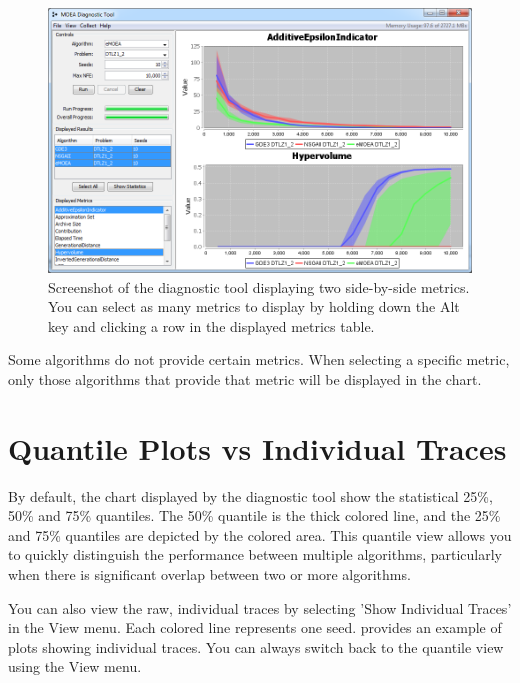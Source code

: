 \begin{figure}
  \includegraphics[width=\linewidth]{diagnosticToolMultiselect.png}
  \caption{Screenshot of the diagnostic tool displaying two side-by-side metrics.  You can select as many metrics to display by holding down the Alt key and clicking a row in the displayed metrics table.}
  \label{fig:diagnosticToolMultiselect}
\end{figure}

\begin{tip}
  Some algorithms do not provide certain metrics.  When selecting a specific metric, only those algorithms that provide that metric will be displayed in the chart.
\end{tip}

\section{Quantile Plots vs Individual Traces}
By default, the chart displayed by the diagnostic tool show the statistical 25\%, 50\% and 75\% quantiles.  The 50\% quantile is the thick colored line, and the 25\% and 75\% quantiles are depicted by the colored area.  This quantile view allows you to quickly distinguish the performance between multiple algorithms, particularly when there is significant overlap between two or more algorithms.

You can also view the raw, individual traces by selecting 'Show Individual Traces' in the View menu.  Each colored line represents one seed.   provides an example of plots showing individual traces.  You can always switch back to the quantile view using the View menu.


